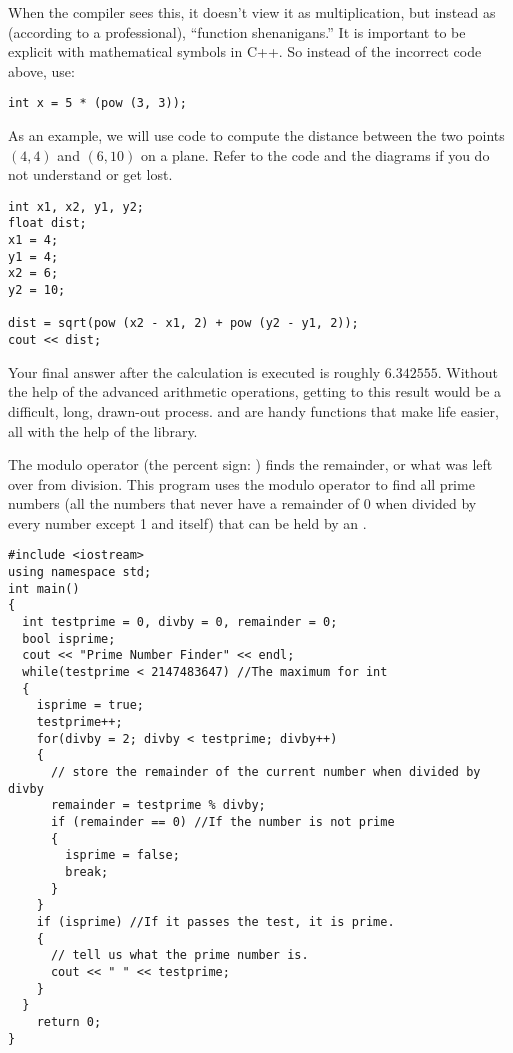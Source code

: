 When the compiler sees this, it doesn't view it as multiplication, but instead as (according to a professional), ``function shenanigans.'' 
It is important to be explicit with mathematical symbols in C++. 
So instead of the incorrect code above, use:

\noindent\begin{minipage}{\linewidth}\begin{lstlisting}
int x = 5 * (pow (3, 3));
\end{lstlisting}\end{minipage}

As an example, we will use code to compute the distance between the two points $(4,4)$ and $(6, 10)$ on a plane.
Refer to the code and the diagrams if you do not understand or get lost.

\noindent\begin{minipage}{\linewidth}\begin{lstlisting}
int x1, x2, y1, y2;
float dist;
x1 = 4;
y1 = 4;
x2 = 6;
y2 = 10;

dist = sqrt(pow (x2 - x1, 2) + pow (y2 - y1, 2));
cout << dist;
\end{lstlisting}\end{minipage}
	
	Your final answer after the calculation is executed is roughly $6.342555$. 
	Without the help of the advanced arithmetic operations, getting to this result would be a difficult, long, drawn-out process. 
	 and  are handy functions that make life easier, all with the help of the  library.

The modulo operator (the percent sign: \Code{\%}) finds the remainder, or what was left over from division. 
This program uses the modulo operator to find all prime numbers (all the numbers that never have a remainder of 0 when divided by every number except 1 and itself) that can be held by an .

\noindent\begin{minipage}{\linewidth}\begin{lstlisting}
#include <iostream>
using namespace std;
int main()
{
  int testprime = 0, divby = 0, remainder = 0;
  bool isprime;
  cout << "Prime Number Finder" << endl;
  while(testprime < 2147483647) //The maximum for int
  {
    isprime = true;
    testprime++;
    for(divby = 2; divby < testprime; divby++)
    {
      // store the remainder of the current number when divided by divby
      remainder = testprime % divby; 
      if (remainder == 0) //If the number is not prime
      {
        isprime = false;
        break;
      }
    }
    if (isprime) //If it passes the test, it is prime.
    {
      // tell us what the prime number is.
      cout << " " << testprime; 
    }
  }
	return 0;
}
\end{lstlisting}\end{minipage}

